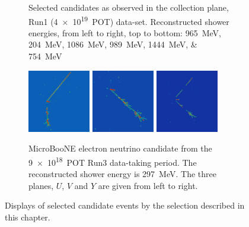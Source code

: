 \begin{figure}[htb]
\begin{subfigure}{\textwidth}
    \caption{\label{fig:nue_r1} Selected \nuecc candidates as observed in the collection plane, Run1 (\SI{4e19}{POT}) data-set. Reconstructed shower energies, from left to right, top to bottom: \SIlist{965;204;1086;989;1444;754}{\MeV}\\}
    \end{subfigure}
    
    \begin{subfigure}{\textwidth}
    \centering
    \includegraphics[width=0.3\textwidth]{NueCCsel/Images/evd/r3u}
    \includegraphics[width=0.3\textwidth]{NueCCsel/Images/evd/r3v}
    \includegraphics[width=0.3\textwidth]{NueCCsel/Images/evd/r3y}
    \caption{\label{fig:nue_r3} MicroBooNE electron neutrino candidate from the \SI{9e18}{POT} Run3 data-taking period. The reconstructed shower energy is \SI{297}{\MeV}. The three planes, $U$, $V$ and $Y$ are given from left to right.}
    \end{subfigure}
    
	\caption{\label{fig:nue_evd} Displays of selected \nuecc candidate events by the selection described in this chapter.}
\end{figure}